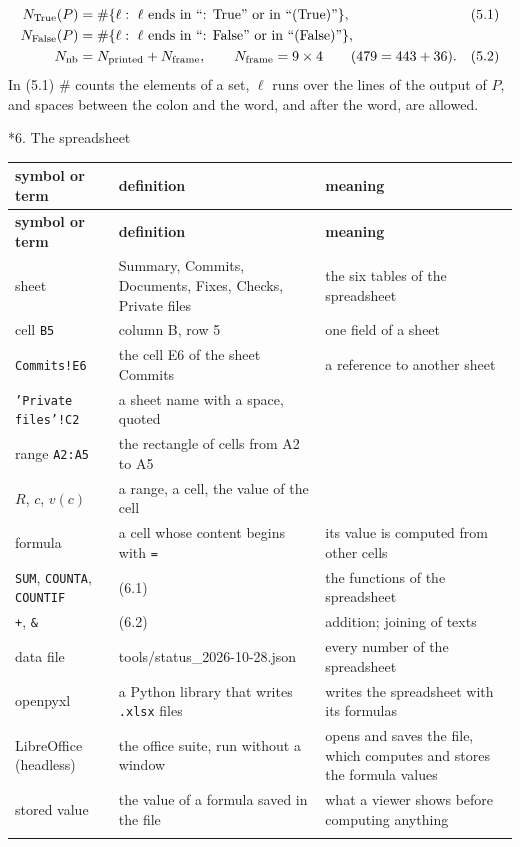 \documentclass[10pt,a4paper]{article}
\makeatletter
\renewcommand\section{\@startsection{section}{1}{\z@}{-3.5ex \@plus -1ex \@minus -.2ex}{2.3ex \@plus.2ex}{\normalfont\Large\bfseries\raggedright}}
\makeatother
\begin{document}
\begin{align*}
N_{\rm True}(P)&=\#\{\ell:\ \ell\ \text{ends in “: True” or in “(True)”}\},&&(5.1) \\
N_{\rm False}(P)&=\#\{\ell:\ \ell\ \text{ends in “: False” or in “(False)”}\}, \\
N_{\rm nb}&=N_{\rm printed}+N_{\rm frame},\qquad N_{\rm frame}=9\times4\qquad(479=443+36).&&(5.2)
\end{align*}
In (5.1) $\#$ counts the elements of a set, $\ell$ runs over the lines of the output of $P$, and spaces between the colon and the word, and after the word, are allowed.

\section*{6. The spreadsheet}
{\footnotesize
\begin{longtable}{>{\raggedright\arraybackslash}p{}>{\raggedright\arraybackslash}p{}>{\raggedright\arraybackslash}p{}}
\toprule
\textbf{symbol or term} & \textbf{definition} & \textbf{meaning} \\
\midrule\endfirsthead
\toprule
\textbf{symbol or term} & \textbf{definition} & \textbf{meaning} \\
\midrule\endhead
\endfoot
\bottomrule\endlastfoot
sheet & Summary, Commits, Documents, Fixes, Checks, Private files & the six tables of the spreadsheet \\
cell \texttt{B5} & column B, row 5 & one field of a sheet \\
\texttt{Commits!E6} & the cell E6 of the sheet Commits & a reference to another sheet \\
\texttt{'Private files'!C2} & a sheet name with a space, quoted &  \\
range \texttt{A2:A5} & the rectangle of cells from A2 to A5 &  \\
$R$, $c$, $v(c)$ & a range, a cell, the value of the cell &  \\
formula & a cell whose content begins with \texttt{=} & its value is computed from other cells \\
\texttt{SUM}, \texttt{COUNTA}, \texttt{COUNTIF} & (6.1) & the functions of the spreadsheet \\
\texttt{+}, \texttt{\&} & (6.2) & addition; joining of texts \\
data file & tools/status\_2026-10-28.json & every number of the spreadsheet \\
openpyxl & a Python library that writes \texttt{.xlsx} files & writes the spreadsheet with its formulas \\
LibreOffice (headless) & the office suite, run without a window & opens and saves the file, which computes and stores the formula values \\
stored value & the value of a formula saved in the file & what a viewer shows before computing anything \\*
\end{longtable}}
\end{document}
